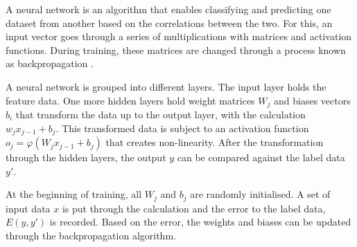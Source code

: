 \documentclass[10pt, a4paper]{UUThesisTemplate}
\begin{document}
A neural network is an algorithm that enables classifying and predicting one dataset from another based on the correlations between the two. For this, an input vector goes through a series of multiplications with matrices and activation functions. During training, these matrices are changed through a process known as backpropagation \cite{NN}.


A neural network is grouped into different layers. The input layer holds the feature data. One more hidden layers hold weight matrices $W_j$ and biases vectors $b_i$ that transform the data up to the output layer, with the calculation $w_j x_{j-1} + b_j$. This transformed data is subject to an activation function $o_j = \varphi(W_j x_{j-1} + b_j)$ that creates non-linearity. After the transformation through the hidden layers, the output $y$ can be compared against the label data $y'$.

At the beginning of training, all $W_j$ and $b_j$ are randomly initialised. A set of input data $x$ is put through the calculation and the error to the label data, $E(y, y')$ is recorded. Based on the error, the weights and biases can be updated through the backpropagation algorithm. 
\end{document}
